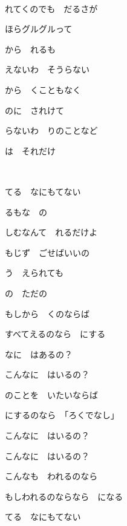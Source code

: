 ~


れてくのでも　だるさが

ほらグルグルって

から　れるも

えないわ　そうらない

から　くこともなく

のに　されけて

らないわ　りのことなど

は　それだけ

~

てる　なにもてない

るもな　の

しむなんて　れるだけよ

もじず　ごせばいいの

う　えられても

の　ただの

もしから　くのならば

すべてえるのなら　にする

なに　はあるの？

こんなに　はいるの？

のことを　いたいならば

にするのなら　「ろくでなし」

こんなに　はいるの？

こんなに　はいるの？

こんなも　われるのなら

もしわれるのならなら　になる

てる　なにもてない

